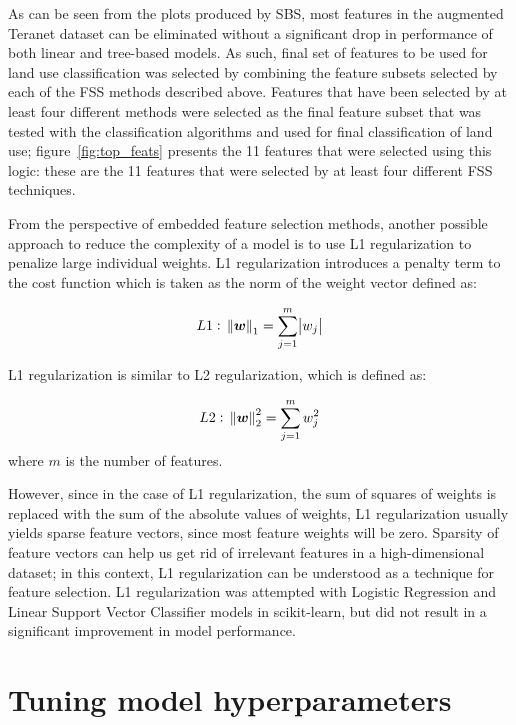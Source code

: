 As can be seen from the plots produced by SBS, most features in the augmented Teranet dataset can be eliminated without a significant drop in performance of both linear and tree-based models.
As such, final set of features to be used for land use classification was selected by combining the feature subsets selected by each of the FSS methods described above.
Features that have been selected by at least four different methods were selected as the final feature subset that was tested with the classification algorithms and used for final classification of land use;
figure~\ref{fig:top_feats} presents the 11 features that were selected using this logic: these are the 11 features that were selected by at least four different FSS techniques.

From the perspective of embedded feature selection methods, another possible approach to reduce the complexity of a model is to use L1 regularization to penalize large individual weights.
L1 regularization introduces a penalty term to the cost function which is taken as the norm of the weight vector defined as:

\begin{equation} \label{eq:l1_regularization}
    L1:~\norm{\boldsymbol{w}}_1 = \sum \limits_{j=1}^m \abs{w_j}
\end{equation}

L1 regularization is similar to L2 regularization, which is defined as:

\begin{equation} \label{eq:l2_regularization}
    L2:~\norm{\boldsymbol{w}}_2^2 = \sum \limits_{j=1}^m w_j^2
\end{equation}
where $m$ is the number of features.

However, since in the case of L1 regularization, the sum of squares of weights is replaced with the sum of the absolute values of weights, L1 regularization usually yields sparse feature vectors, since most feature weights will be zero\cite{RaschkaMirjalili2017,Scikit-learndevelopers2019}.
Sparsity of feature vectors can help us get rid of irrelevant features in a high-dimensional dataset;
in this context, L1 regularization can be understood as a technique for feature selection\cite{RaschkaMirjalili2017}.
L1 regularization was attempted with Logistic Regression and Linear Support Vector Classifier models in scikit-learn, but did not result in a significant improvement in model performance.

\section{Tuning model hyperparameters} \label{sec:tuning_hyperparameters}

